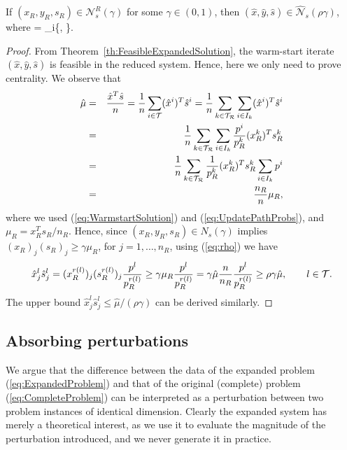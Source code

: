 \begin{theorem}  \label{th:NeighbourhoodExpandedSolution}
If $(x_R, y_R, s_R) \in \mathcal{N}^R_s(\gamma)$ 
for some $\gamma\in(0,1)$, then $(\hat{x}, \hat{y}, \hat{s})\in
\widehat{\mathcal{N}}_s(\rho\gamma)$,
where
\be  \label{eq:rho}
  \rho = \min_{i\in\Ctree}\left\{, 
                                 \right\}.
\ee
\end{theorem}
%
\begin{proof}
From Theorem~\ref{th:FeasibleExpandedSolution}, the warm-start iterate 
$(\hat x, \hat y, \hat s)$ is feasible in the reduced system.
Hence, here we only need to prove centrality. 
We observe that 
\begin{eqnarray*}
  \hat{\mu} &=& \frac{\hat{x}^T\hat{s}}{n} 
   = \frac{1}{n}\sum_{i \in \mathcal{T}}(\hat x^i)^T\hat{s}^i 
   = \frac{1}{n}\sum_{k\in \mathcal{T}_\mathcal{R}}\sum_{i\in I_k} (\hat{x}^i)^T\hat{s}^i \\
  &=& \frac{1}{n}\sum_{k\in \mathcal{T}_\mathcal{R}}\sum_{i\in I_k} \frac{p^i}{p_R^k} 
      (x_R^k)^T s_R^k \\
  &=& \frac{1}{n} \sum_{k\in\mathcal{T}_\mathcal{R}} \frac{1}{p_R^k}(x_R^k)^T s_R^k
      \sum_{i\in I_k}p^i\\
  &=& \frac{n_R}{n} \mu_R,
\end{eqnarray*}
where we used (\ref{eq:WarmstartSolution}) and (\ref{eq:UpdatePathProbs}), 
and $\mu_R = x_R^Ts_R/n_R$. 
Hence, since $(x_R, y_R, s_R)\in N_s(\gamma)$ 
implies $(x_R)_j (s_R)_j\ge \gamma\mu_R$, for $j = 1, \ldots, n_R$, 
using (\ref{eq:rho}) we have
\[
  \hat x^l_j\hat s^l_j = (x_R^{r(l)})_j (s_R^{r(l)})_j
                         \frac{p^l}{p_R^{r(l)}}
                       \ge \gamma\mu_R \frac{p^l}{p_R^{r(l)}}
		       = \gamma\hat\mu \frac{n}{n_R}\frac{p^l}{p_R^{r(l)}}
                       \ge \rho\gamma\hat{\mu},
		       \qquad l \in \mathcal{T}.
\]
The upper bound $\hat x^l_j\hat s^l_j\le \hat{\mu}/(\rho\gamma)$
can be derived similarly.
\end{proof}

%
%
\subsection{Absorbing perturbations}

We argue that the difference between the data of the expanded 
problem (\ref{eq:ExpandedProblem}) and that of the original (complete) 
problem (\ref{eq:CompleteProblem}) can be interpreted as a perturbation 
between two problem instances of identical dimension. 
Clearly the expanded system has merely a theoretical
interest, as we use it to evaluate the magnitude of the 
perturbation introduced, and we never generate it in practice.

